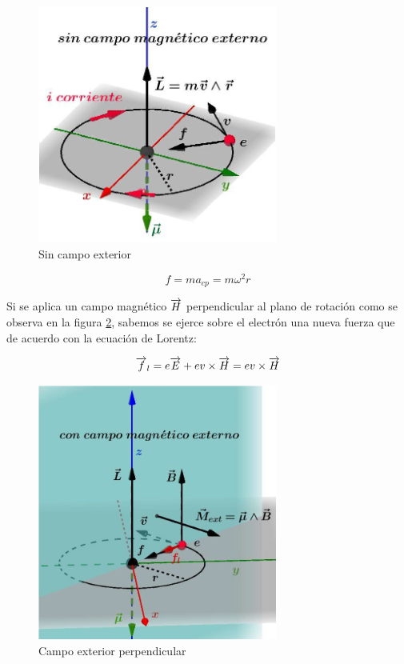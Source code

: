 \begin{figure}[H]
    \centering
    \includegraphics[width=0.7\textwidth]{./Figures/fig_s8}
	\caption{Sin campo exterior}
	\label{fig:s8}
\end{figure}

\begin{equation}
  f=ma_{cp}=m\omega^{2} r
\end{equation}

Si se aplica un campo magnético $\overrightarrow{H}$ perpendicular al plano de rotación como se observa en la figura \ref{fig:s9}, sabemos se ejerce sobre el electrón una nueva fuerza que de acuerdo con la ecuación de Lorentz:

\begin{equation}
  \overrightarrow{f}_{l}= e\overrightarrow{E} + ev \times \overrightarrow{H} = ev \times \overrightarrow{H}
\end{equation}

\begin{figure}[H]
    \centering
    \includegraphics[width=0.7\textwidth]{./Figures/fig_s9}
	\caption{Campo exterior perpendicular}
	\label{fig:s9}
\end{figure}




